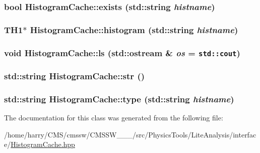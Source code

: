 \hypertarget{classHistogramCache_a3}{
\subsubsection[exists]{\setlength{\rightskip}{0pt plus 5cm}bool Histogram\-Cache::exists (std::string {\em histname})}}
\label{classHistogramCache_a3}


\hypertarget{classHistogramCache_a7}{
\subsubsection[histogram]{\setlength{\rightskip}{0pt plus 5cm}TH1$\ast$ Histogram\-Cache::histogram (std::string {\em histname})}}
\label{classHistogramCache_a7}


\hypertarget{classHistogramCache_a8}{
\subsubsection[ls]{\setlength{\rightskip}{0pt plus 5cm}void Histogram\-Cache::ls (std::ostream \& {\em os} = {\tt std::cout})}}
\label{classHistogramCache_a8}


\hypertarget{classHistogramCache_a9}{
\subsubsection[str]{\setlength{\rightskip}{0pt plus 5cm}std::string Histogram\-Cache::str ()}}
\label{classHistogramCache_a9}


\hypertarget{classHistogramCache_a6}{
\subsubsection[type]{\setlength{\rightskip}{0pt plus 5cm}std::string Histogram\-Cache::type (std::string {\em histname})}}
\label{classHistogramCache_a6}




The documentation for this class was generated from the following file:\begin{CompactItemize}
\item 
/home/harry/CMS/cmssw/CMSSW\_\_\_/src/Physics\-Tools/Lite\-Analysis/interface/\hyperlink{HistogramCache_8hpp}{Histogram\-Cache.hpp}\end{CompactItemize}
